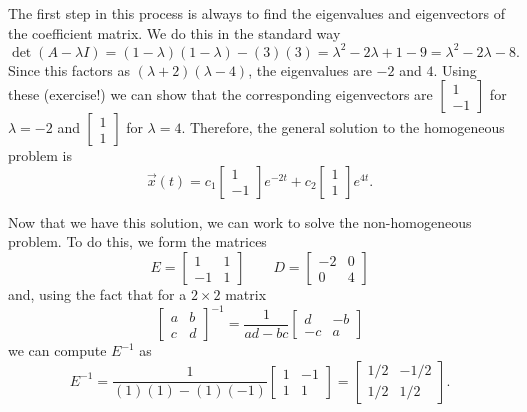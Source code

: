 \begin{exampleSol}
The first step in this process is always to find the eigenvalues and eigenvectors of the coefficient matrix. We do this in the standard way
\begin{equation*}
\det(A - \lambda I) = (1-\lambda)(1-\lambda) - (3)(3) = \lambda^2 - 2\lambda + 1 - 9 = \lambda^2 - 2 \lambda - 8.
\end{equation*}
Since this factors as $(\lambda + 2)(\lambda - 4)$, the eigenvalues are $-2$ and $4$. Using these (exercise!) we can show that the corresponding eigenvectors are $\left[\begin{smallmatrix} 1 \\ -1 \end{smallmatrix}\right]$ for $\lambda = -2$ and $\left[\begin{smallmatrix} 1 \\ 1 \end{smallmatrix}\right]$ for $\lambda = 4$. Therefore, the general solution to the homogeneous problem is
\begin{equation*}
\vec{x}(t) = c_1 \begin{bmatrix} 1 \\ -1 \end{bmatrix}e^{-2t} + c_2 \begin{bmatrix} 1 \\ 1 \end{bmatrix}e^{4t}.
\end{equation*}

Now that we have this solution, we can work to solve the non-homogeneous problem. To do this, we form the matrices
\begin{equation*}
E = \begin{bmatrix} 1 & 1 \\ -1 & 1 \end{bmatrix} \qquad D = \begin{bmatrix} -2 & 0 \\ 0 & 4 \end{bmatrix}
\end{equation*}
and, using the fact that for a $ 2 \times 2$ matrix
\begin{equation*}
\begin{bmatrix} 
a& b \\
c & d 
\end{bmatrix}^{-1} = \frac{1}{ad-bc} \begin{bmatrix}
d & -b \\ -c & a
\end{bmatrix}
\end{equation*} 
we can compute $E^{-1}$ as
\begin{equation*}
E^{-1} = \frac{1}{(1)(1) - (1)(-1)} \begin{bmatrix} 1 & -1 \\ 1 & 1 \end{bmatrix} = \begin{bmatrix} 1/2 & -1/2 \\ 1/2 & 1/2 \end{bmatrix}.
\end{equation*}


\end{exampleSol}
